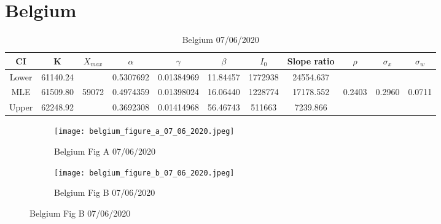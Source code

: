 \documentclass{article}
\begin{document}
\section{Belgium}

\begin{table}[ht]
    \centering
\begin{tabular}{|c|c|c|c|c|c|c|c|c|c|c|}
     \hline
     CI & K & $X_{max}$ & $\alpha$ & $\gamma$ & $\beta$ & $I_0$ & Slope ratio  & $\rho$ & $\sigma_x$ & $\sigma_w$\\     \hline
     \hline
Lower	&61140.24&	&0.5307692	&0.01384969	&11.84457	&1772938& 	24554.637 &&&  \\
     \hline
MLE	    &61509.80& 59072 &0.4974359	&0.01398024	&16.06440	&1228774& 	17178.552 & 0.2403 & 0.2960 & 0.0711  \\
     \hline
Upper	&62248.92&	&0.3692308	&0.01414968	&56.46743	&511663	&   7239.866  &&&  \\
\hline
\end{tabular}
    \caption{Belgium 07/06/2020}
\end{table}

\begin{figure}[htb]
\centering
    \begin{subfigure}{0.5\textwidth}
        \texttt{[image: belgium\_figure\_a\_07\_06\_2020.jpeg]}
        \caption{Belgium Fig A 07/06/2020}
        \label{fig:belgium_figure_a_07_06_2020}
    \end{subfigure}%
        \begin{subfigure}{0.5\textwidth}                                   \texttt{[image: belgium\_figure\_b\_07\_06\_2020.jpeg]}
        \caption{Belgium Fig B 07/06/2020}
        \label{fig:belgium_figure_b_07_06_2020}
    \end{subfigure}
\end{figure}
\end{document}
